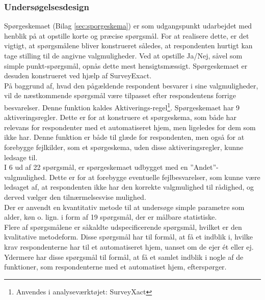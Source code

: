 \subsubsection{Undersøgelsesdesign} 
\label{sec:undersoegelsesdesign}
Spørgeskemaet (Bilag \ref{sec:sporgeskema}) er som udgangspunkt udarbejdet med henblik på at opstille korte og præcise spørgsmål. For at realisere dette, er det vigtigt, at spørgsmålene bliver konstrueret således, at respondenten hurtigt kan tage stilling til de angivne valgmuligheder. Ved at opstille Ja/Nej, såvel som simple punkt-spørgsmål, opnås dette mest hensigtsmæssigt. Spørgeskemaet er desuden konstrueret ved hjælp af SurveyExact.\\

På baggrund af, hvad den pågældende respondent besvarer i sine valgmuligheder, vil de næstkommende spørgsmål være tilpasset efter respondentens forrige besvarelser. Denne funktion kaldes Aktiverings-regel\footnote{Anvendes i analyseværktøjet: SurveyXact}. Spørgeskemaet har 9 aktiveringsregler. Dette er for at konstruere et spørgeskema, som både har relevans for respondenter med et automatiseret hjem, men ligeledes for dem som ikke har. Denne funktion er både til glæde for respondenten, men også for at forebygge fejlkilder, som et spørgeskema, uden disse aktiveringsregler, kunne ledsage til. \\

I 6 ud af 22 spørgsmål, er spørgeskemaet udbygget med en ”Andet”-valgmulighed. Dette er for at forebygge eventuelle fejlbesvarelser, som kunne være ledsaget af, at respondenten ikke har den korrekte valgmulighed til rådighed, og derved vælger den tilnærmelsesvise mulighed. \\

Der er anvendt en kvantitativ metode til at undersøge simple parametre som alder, køn o. lign. i form af 19 spørgsmål, der er målbare statistiske. \\

Flere af spørgsmålene er såkaldte udspecificerende spørgsmål, hvilket er den kvalitative metodeform. Disse spørgsmål har til formål, at få et indblik i, hvilke krav respondenterne har til et automatiseret hjem, uanset om de ejer ét eller ej. Ydermere har disse spørgsmål til formål, at få et samlet indblik i nogle af de funktioner, som respondenterne med et automatiset hjem, efterspørger. \\

